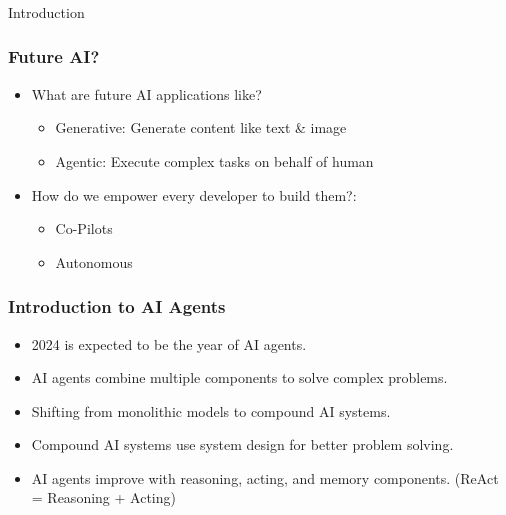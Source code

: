 \begin{frame}[fragile]\frametitle{}
\begin{center}
{\Large Introduction}
\end{center}
\end{frame}

\begin{frame}[fragile]\frametitle{Future AI?}
  \begin{itemize}
    \item What are future AI applications like?
	\begin{itemize}
		\item Generative: Generate content like text \& image
		\item Agentic: Execute complex tasks on behalf of human
	 \end{itemize}
	\item How do we empower every developer to build them?: 
	\begin{itemize}
		\item Co-Pilots
		\item Autonomous
	 \end{itemize}	
  \end{itemize}
\end{frame}

\begin{frame}[fragile]\frametitle{Introduction to AI Agents}
    \begin{itemize}
        \item 2024 is expected to be the year of AI agents.
        \item AI agents combine multiple components to solve complex problems.
        \item Shifting from monolithic models to compound AI systems.
        \item Compound AI systems use system design for better problem solving.
        \item AI agents improve with reasoning, acting, and memory components. (ReAct = Reasoning + Acting)
    \end{itemize}
\end{frame}

